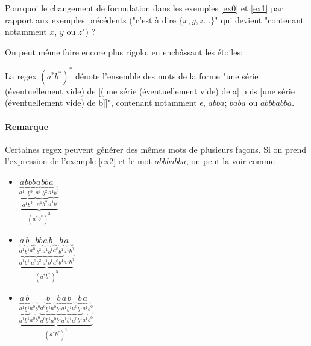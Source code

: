 \begin{exercice}
Pourquoi le changement de formulation dans les exemples \ref{ex0} et \ref{ex1} par rapport aux exemples précédents ("c'est à dire $\{x, y, z ... \}$" qui devient "contenant notamment $x$, $y$ ou $z$") ?
\end{exercice}

On peut même faire encore plus rigolo, en enchâssant les étoiles:


\begin{example}
\label{ex2}
La regex $(a^*b^*)^*$ dénote l'ensemble des mots de la forme "une série (éventuellement vide) de [(une série (éventuellement vide) de a] puis [une série (éventuellement vide) de b]]", contenant notamment $\epsilon$, $abba$; $baba$ ou $abbbabba$. 
\end{example}

\paragraph{Remarque} Certaines regex peuvent générer des mêmes mots de plusieurs façons. Si on prend l'expression de l'exemple \ref{ex2} et le mot $abbbabba$, on peut la voir comme 

\begin{itemize}
    \item $\underbrace{\underbrace{\underbrace{a}_\text{$a^1$}\underbrace{bbb}_\text{$b^3$}}_\text{$a^1b^3$}\underbrace{\underbrace{a}_\text{$a^1$}\underbrace{bb}_\text{$b^2$}}_\text{$a^1b^2$}\underbrace{\underbrace{a}_\text{$a^1$}\underbrace{ }_\text{$b^0$}}_\text{$a^1b^0$}}_\text{$(a^*b^*)^3$}$   
    \item $\underbrace{\underbrace{\underbrace{a}_\text{$a^1$}\underbrace{b}_\text{$b^1$}}_\text{$a^1b^1$}\underbrace{\underbrace{ }_\text{$a^0$}\underbrace{bb}_\text{$b^2$}}_\text{$a^0b^2$}\underbrace{\underbrace{a}_\text{$a^1$}\underbrace{b }_\text{$b^1$}}_\text{$a^1b^1$}\underbrace{\underbrace{ }_\text{$a^0$}\underbrace{b }_\text{$b^1$}}_\text{$a^0b^1$}\underbrace{\underbrace{a}_\text{$a^1$}\underbrace{  }_\text{$b^0$}}_\text{$a^1b^0$}}_\text{$(a^*b^*)^5$}$
   
    \item $\underbrace{\underbrace{\underbrace{a}_\text{$a^1$}\underbrace{b}_\text{$b^1$}}_\text{$a^1b^1$}\underbrace{\underbrace{ }_\text{$a^0$}\underbrace{ }_\text{$b^0$}}_\text{$a^0b^0$}\underbrace{\underbrace{ }_\text{$a^0$}\underbrace{b}_\text{$b^1$}}_\text{$a^0b^1$}\underbrace{\underbrace{ }_\text{$a^0$}\underbrace{b}_\text{$b^1$}}_\text{$a^0b^1$}\underbrace{\underbrace{a}_\text{$a^1$}\underbrace{b }_\text{$b^1$}}_\text{$a^1b^1$}\underbrace{\underbrace{ }_\text{$a^0$}\underbrace{b }_\text{$b^1$}}_\text{$a^0b^1$}\underbrace{\underbrace{a}_\text{$a^1$}\underbrace{  }_\text{$b^0$}}_\text{$a^1b^0$}}_\text{$(a^*b^*)^7$}$
\end{itemize}


